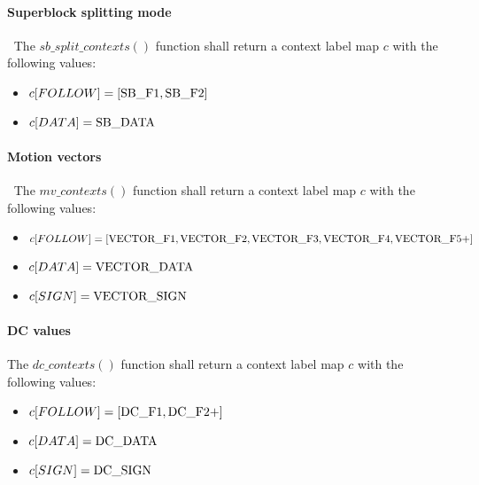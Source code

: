 \paragraph{Superblock splitting mode}\label{sbcontexts}
$\ $\newline
The $sb\_split\_contexts()$ function shall return a context label map $c$ with the 
following values:

\begin{itemize}
\item $c[FOLLOW] = [ \text{SB\_F1}, \text{SB\_F2} ]$
\item $c[DATA] = \text{SB\_DATA}$
\end{itemize}

\paragraph{Motion vectors}
\label{mvcontexts}
$\ $\newline
The $mv\_contexts()$ function shall return a context label map $c$ with the 
following values:

\begin{itemize}
\item $c[FOLLOW] = [ \text{VECTOR\_F1}, \text{VECTOR\_F2}, \text{VECTOR\_F3}, \text{VECTOR\_F4}, \text{VECTOR\_F5+} ]$
\item $c[DATA] = \text{VECTOR\_DATA}$
\item $c[SIGN] = \text{VECTOR\_SIGN}$
\end{itemize}

\paragraph{DC values}
\label{dcvaluecontexts}

The $dc\_contexts()$ function shall return a context label map $c$ with the 
following values:

\begin{itemize}
\item $c[FOLLOW] = [ \text{DC\_F1}, \text{DC\_F2+} ]$
\item $c[DATA] = \text{DC\_DATA}$
\item $c[SIGN] = \text{DC\_SIGN}$
\end{itemize}
